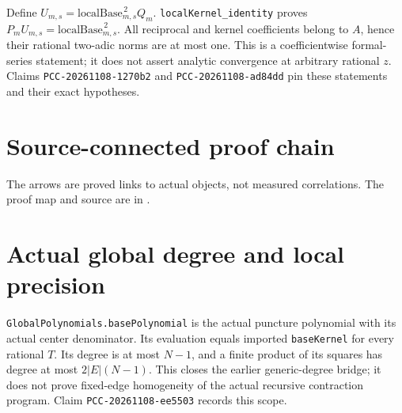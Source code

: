 \documentclass[10pt]{article}
\begin{document}
Define $U_{m,s}=\mathrm{localBase}_{m,s}^{\,2}Q_m$.
\texttt{localKernel\_identity} proves $P_mU_{m,s}=\mathrm{localBase}_{m,s}^{\,2}$.
All reciprocal and kernel coefficients belong to $A$, hence their rational
two-adic norms are at most one. This is a coefficientwise formal-series
statement; it does not assert analytic convergence at arbitrary rational $z$.
Claims \texttt{PCC-20261108-1270b2} and \texttt{PCC-20261108-ad84dd} pin these
statements and their exact hypotheses.

\newpage
\section*{Source-connected proof chain}
\begin{center}\end{center}
The arrows are proved links to actual objects, not measured correlations.
The proof map and source are in .

\section*{Actual global degree and local precision}
\texttt{GlobalPolynomials.basePolynomial} is the actual puncture polynomial
with its actual center denominator. Its evaluation equals imported
\texttt{baseKernel} for every rational $T$. Its degree is at most $N-1$,
and a finite product of its squares has degree at most $2|E|(N-1)$.
This closes the earlier generic-degree bridge; it does not prove fixed-edge
homogeneity of the actual recursive contraction program.
Claim \texttt{PCC-20261108-ee5503} records this scope.
\end{document}
